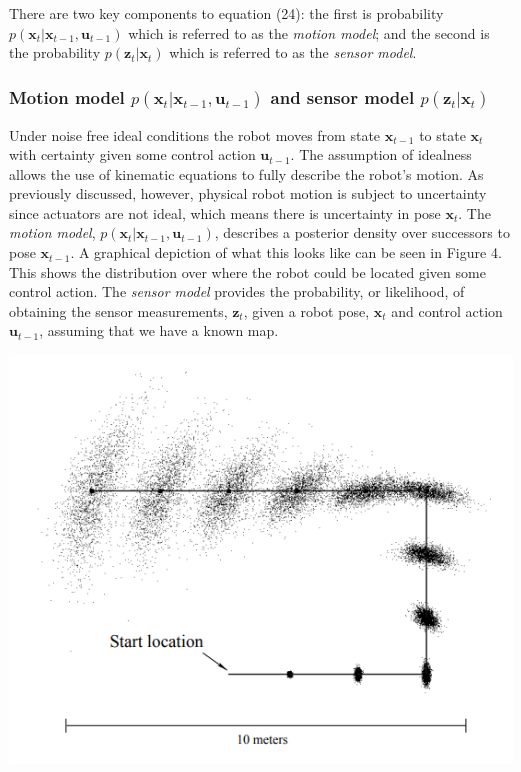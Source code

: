 \documentclass[a4paper]{article}
\begin{document}
There are two key components to equation (24):  the first is probability $p(\mathbf{x}_t| \mathbf{x}_{t-1}, \mathbf{u}_{t-1})$ which is referred to as the \textit{motion model}; and the second is the probability $p(\mathbf{z}_t|\mathbf{x}_t)$ which is referred to as the \textit{sensor model}.

\subsubsection{Motion model $p(\mathbf{x}_t| \mathbf{x}_{t-1}, \mathbf{u}_{t-1})$ and sensor model $p(\mathbf{z}_t|\mathbf{x}_t)$}
\begin{minipage}{0.45\textwidth}
Under noise free ideal conditions the robot moves from state $\mathbf{x}_{t-1}$ to state $\mathbf{x}_t$ with certainty given some control action $\mathbf{u}_{t-1}$. The assumption of idealness allows the use of kinematic equations to fully describe the robot's motion. As previously discussed, however, physical robot motion is subject to uncertainty since actuators are not ideal, which means there is uncertainty in pose $\mathbf{x}_{t}$. The \textit{motion model}, $p(\mathbf{x}_t| \mathbf{x}_{t-1}, \mathbf{u}_{t-1})$, describes a posterior density over successors to pose $\mathbf{x}_{t-1}$. A graphical depiction of what this looks like can be seen in Figure 4. This shows the distribution over where the robot could be located given some control action. The \textit{sensor model} provides the probability, or likelihood, of obtaining the sensor measurements, $\mathbf{z}_t$, given a robot pose, $\mathbf{x}_t$ and control action $\mathbf{u}_{t-1}$, assuming that we have a known map.
\end{minipage}
\hspace{0.5cm}
\begin{minipage}{0.45\textwidth}
\centering
\includegraphics[scale=0.40]{motion_model}
\end{minipage}
\end{document}

